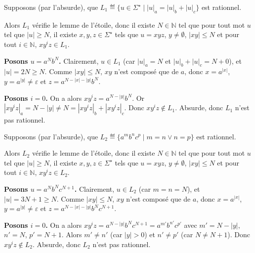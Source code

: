 \begin{corrections}

  \begin{questions}

  \item Supposons (par l'absurde), que $L_1 \eqdef \{u \in \Sigma^\star \mid |u|_a = |u|_b + |u|_c \}$ est rationnel.
    
    Alors $L_1$ vérifie le lemme de l'étoile, donc il existe $N \in \mathbb{N}$ tel que pour tout mot $u$ tel que $|u|\ge N$,
    il existe $x, y, z \in \Sigma^\star$ tels que $u=xyz$, $y\neq \emptyset$, $|xy| \le N$ et pour tout $i\in \mathbb{N}$, $xy^i z\in L_1$.
    
    \textbf{Posons $u=a^Nb^N$.} Clairement, $u\in L_1$ (car $|u|_a=N$ et $|u|_b+|u|_c=N+0$), et $|u|=2N\ge N$.
    Comme $|xy|\le N$, $xy$ n'est composé que de $a$, donc $x=a^{|x|}$, $y=a^{|y|}\neq\varepsilon$ et $z=a^{N-|x|-|y|}b^N$.
    
    \textbf{Posons $i=0$.} On a alors $xy^iz=a^{N-|y|}b^N$.
    Or $|xy^iz|_a = N-|y| \neq N = |xy^iz|_b + |xy^iz|_c$. Donc $xy^iz \notin L_1$.
    Absurde, donc $L_1$ n'est pas rationnel.

  \item Supposons (par l'absurde), que $L_2 \eqdef \{a^m b^n c^p \mid m=n \lor n=p\}$ est rationnel.
    
    Alors $L_2$ vérifie le lemme de l'étoile, donc il existe $N \in \mathbb{N}$ tel que pour tout mot $u$ tel que $|u|\ge N$,
    il existe $x, y, z \in \Sigma^\star$ tels que $u=xyz$, $y\neq \emptyset$, $|xy| \le N$ et pour tout $i\in \mathbb{N}$, $xy^i z\in L_2$.
    
    \textbf{Posons $u=a^N b^N c^{N+1}$.} Clairement, $u\in L_2$ (car $m=n=N$), et $|u|=3N+1\ge N$.
    Comme $|xy|\le N$, $xy$ n'est composé que de $a$, donc $x=a^{|x|}$, $y=a^{|y|}\neq\varepsilon$ et $z=a^{N-|x|-|y|}b^N c^{N+1}$.
    
    \textbf{Posons $i=0$.} On a alors $xy^iz=a^{N-|y|}b^N c^{N+1} = a^{m'}b^{n'}c^{p'}$ avec $m'=N-|y|$, $n'=N$, $p'=N+1$.
    Alors $m'\neq n'$ (car $|y|>0$) et $n'\neq p'$ (car $N\neq N+1$). Donc $xy^iz \notin L_2$.
    Absurde, donc $L_2$ n'est pas rationnel.

  \end{questions}

\end{corrections}

\endgroup
\endinput
